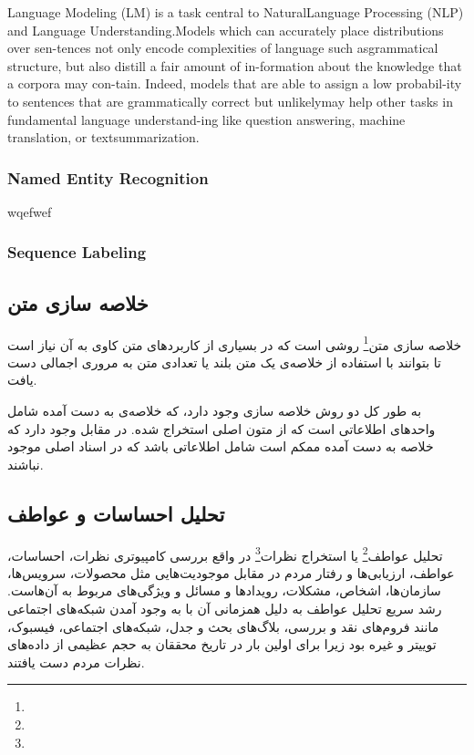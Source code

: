\documentclass[12pt, a4paper, oneside]{report}
\begin{document}
Language  Modeling  (LM)  is  a  task  central  to  NaturalLanguage Processing (NLP) and Language Understanding.Models which can accurately place distributions over sen-tences not only encode complexities of language such asgrammatical structure, but also distill a fair amount of in-formation  about  the  knowledge  that  a  corpora  may  con-tain. Indeed, models that are able to assign a low probabil-ity to sentences that are grammatically correct but unlikelymay help other tasks in fundamental language understand-ing  like  question  answering,  machine  translation,  or  textsummarization.
\cite{jozefowicz2016exploring}

\subsubsection{Named Entity Recognition}
wqefwef

\subsubsection{Sequence Labeling}

\subsection{خلاصه سازی متن}

خلاصه سازی متن\footnote{}
روشی است که در بسیاری از کاربرد‌های متن کاوی به آن نیاز است تا بتوانند با استفاده از خلاصه‌ی یک متن بلند
یا تعدادی متن به مروری اجمالی دست یافت.

به طور کل دو روش خلاصه سازی وجود دارد،
که خلاصه‌ی به دست آمده شامل واحد‌های اطلاعاتی است که از متون اصلی استخراج شده. در مقابل
وجود دارد که خلاصه به دست آمده ممکم است شامل اطلاعاتی باشد که در اسناد اصلی موجود نباشند\cite{DBLP:journals/corr/AllahyariPASTGK17a}.

\subsection{تحلیل احساسات و عواطف}

تحلیل عواطف\footnote{}
یا
استخراج نظرات\footnote{}
در واقع بررسی کامپیوتری نظرات، احساسات، عواطف، ارزیابی‌ها و رفتار مردم در مقابل موجودیت‌هایی
مثل محصولات، سرویس‌ها، سازمان‌ها، اشخاص، مشکلات، رویدادها و مسائل و ویژگی‌های مربوط به آن‌هاست.
رشد سریع
تحلیل عواطف
به دلیل همزمانی آن با به وجود آمدن شبکه‌های اجتماعی مانند فروم‌های نقد و بررسی، بلاگ‌های بحث و جدل،
شبکه‌های اجتماعی، فیسبوک، توییتر و غیره بود زیرا برای اولین بار در تاریخ محققان به حجم عظیمی
از داده‌های نظرات مردم دست یافتند.
\cite{zhang2018deep}
\end{document}
